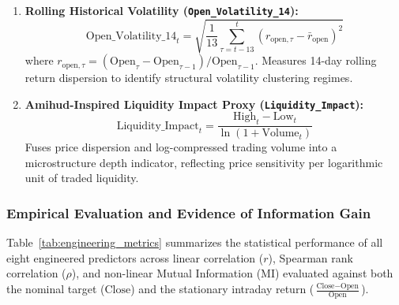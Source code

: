 \documentclass[conference]{IEEEtran}
\begin{document}
\begin{enumerate}
    \item \textbf{Rolling Historical Volatility (\texttt{Open\_Volatility\_14}):}
    \begin{equation}
        \text{Open\_Volatility\_14}_t = \sqrt{\frac{1}{13}\sum_{\tau=t-13}^{t} \left(r_{\text{open}, \tau} - \bar{r}_{\text{open}}\right)^2}
    \end{equation}
    where $r_{\text{open}, \tau} = (\text{Open}_\tau - \text{Open}_{\tau-1}) / \text{Open}_{\tau-1}$. Measures 14-day rolling return dispersion to identify structural volatility clustering regimes.
    
    \item \textbf{Amihud-Inspired Liquidity Impact Proxy (\texttt{Liquidity\_Impact}):}
    \begin{equation}
        \text{Liquidity\_Impact}_t = \frac{\text{High}_t - \text{Low}_t}{\ln(1 + \text{Volume}_t)}
    \end{equation}
    Fuses price dispersion and log-compressed trading volume into a microstructure depth indicator, reflecting price sensitivity per logarithmic unit of traded liquidity.
\end{enumerate}

\subsubsection{Empirical Evaluation and Evidence of Information Gain}
Table~\ref{tab:engineering_metrics} summarizes the statistical performance of all eight engineered predictors across linear correlation ($r$), Spearman rank correlation ($\rho$), and non-linear Mutual Information (MI) evaluated against both the nominal target ($\text{Close}$) and the stationary intraday return ($\frac{\text{Close} - \text{Open}}{\text{Open}}$).
\end{document}
